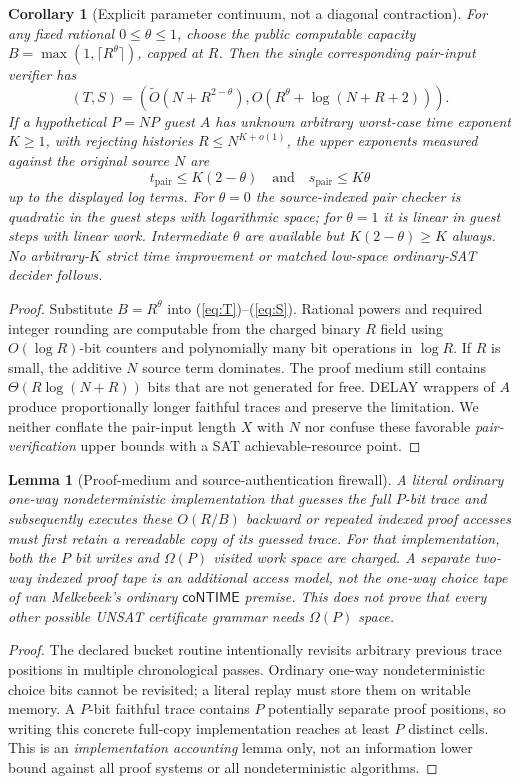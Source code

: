 \documentclass[11pt]{article}
\newtheorem{lemma}[theorem]{Lemma}
\newtheorem{corollary}[theorem]{Corollary}
\begin{document}
\begin{corollary}[Explicit parameter continuum, not a diagonal contraction]\label{cor:K}
For any fixed rational $0\le\theta\le1$, choose the \emph{public computable} capacity $B=\max(1,\lceil R^\theta\rceil)$, capped at $R$. Then the single corresponding pair-input verifier has
\[
 (T,S)=
 \left(\widetilde O(N+R^{2-\theta}),
       O(R^\theta+\log(N+R+2))\right).
\tag{3}
\]
If a hypothetical $P=NP$ guest $A$ has unknown arbitrary worst-case time exponent $K\ge1$, with rejecting histories $R\le N^{K+o(1)}$, the \emph{upper} exponents measured against the original source $N$ are
\[
 t_{\mathrm{pair}}\le K(2-\theta)\quad\text{and}\quad
 s_{\mathrm{pair}}\le K\theta
\]
up to the displayed log terms. For $\theta=0$ the source-indexed pair checker is quadratic in the guest steps with logarithmic space; for $\theta=1$ it is linear in guest steps with linear work. Intermediate $\theta$ are available but $K(2-\theta)\ge K$ always. No arbitrary-$K$ strict time improvement or matched low-space ordinary-SAT decider follows.
\end{corollary}
\begin{proof}
Substitute $B=R^\theta$ into (\ref{eq:T})--(\ref{eq:S}). Rational powers and required integer rounding are computable from the charged binary $R$ field using $O(\log R)$-bit counters and polynomially many bit operations in $\log R$. If $R$ is small, the additive $N$ source term dominates. The proof medium still contains $\Theta(R\log(N+R))$ bits that are not generated for free. DELAY wrappers of $A$ produce proportionally longer faithful traces and preserve the limitation. We neither conflate the pair-input length $X$ with $N$ nor confuse these favorable \emph{pair-verification} upper bounds with a SAT achievable-resource point.
\end{proof}

\begin{lemma}[Proof-medium and source-authentication firewall]\label{lem:medium}
A literal ordinary one-way nondeterministic implementation that guesses the full $P$-bit trace and subsequently executes these $O(R/B)$ backward or repeated indexed proof accesses must first retain a rereadable copy of its guessed trace. For \emph{that implementation}, both the $P$ bit writes and $\Omega(P)$ visited work space are charged. A separate two-way indexed proof tape is an additional access model, not the one-way choice tape of van Melkebeek's ordinary $\mathsf{coNTIME}$ premise. This does not prove that every other possible UNSAT certificate grammar needs $\Omega(P)$ space.
\end{lemma}
\begin{proof}
The declared bucket routine intentionally revisits arbitrary previous trace positions in multiple chronological passes. Ordinary one-way nondeterministic choice bits cannot be revisited; a literal replay must store them on writable memory. A $P$-bit faithful trace contains $P$ potentially separate proof positions, so writing this concrete full-copy implementation reaches at least $P$ distinct cells. This is an \emph{implementation accounting} lemma only, not an information lower bound against all proof systems or all nondeterministic algorithms.
\end{proof}
\end{document}
